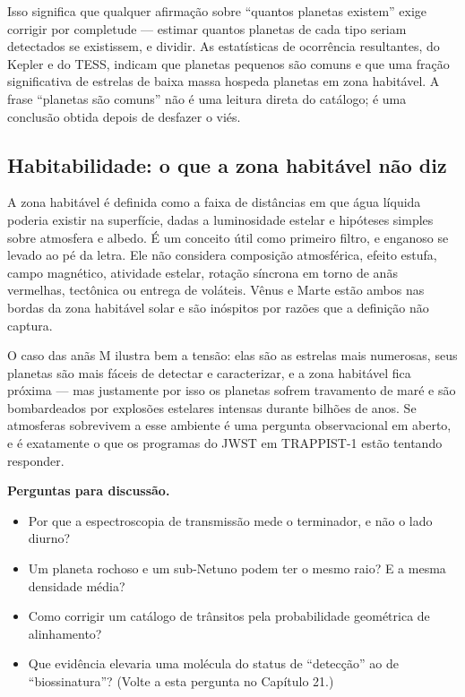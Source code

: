 \documentclass[11pt,a4paper]{article}
\begin{document}
Isso significa que qualquer afirmação sobre ``quantos planetas existem'' exige corrigir por completude --- estimar quantos planetas de cada tipo seriam detectados se existissem, e dividir. As estatísticas de ocorrência resultantes, do Kepler e do TESS, indicam que planetas pequenos são comuns e que uma fração significativa de estrelas de baixa massa hospeda planetas em zona habitável. A frase ``planetas são comuns'' não é uma leitura direta do catálogo; é uma conclusão obtida depois de desfazer o viés.

\subsection*{Habitabilidade: o que a zona habitável não diz}

A zona habitável é definida como a faixa de distâncias em que água líquida poderia existir na superfície, dadas a luminosidade estelar e hipóteses simples sobre atmosfera e albedo. É um conceito útil como primeiro filtro, e enganoso se levado ao pé da letra. Ele não considera composição atmosférica, efeito estufa, campo magnético, atividade estelar, rotação síncrona em torno de anãs vermelhas, tectônica ou entrega de voláteis. Vênus e Marte estão ambos nas bordas da zona habitável solar e são inóspitos por razões que a definição não captura.

O caso das anãs M ilustra bem a tensão: elas são as estrelas mais numerosas, seus planetas são mais fáceis de detectar e caracterizar, e a zona habitável fica próxima --- mas justamente por isso os planetas sofrem travamento de maré e são bombardeados por explosões estelares intensas durante bilhões de anos. Se atmosferas sobrevivem a esse ambiente é uma pergunta observacional em aberto, e é exatamente o que os programas do JWST em TRAPPIST-1 estão tentando responder.

\textbf{Perguntas para discussão.}
\begin{itemize}
\item Por que a espectroscopia de transmissão mede o terminador, e não o lado diurno?
\item Um planeta rochoso e um sub-Netuno podem ter o mesmo raio? E a mesma densidade média?
\item Como corrigir um catálogo de trânsitos pela probabilidade geométrica de alinhamento?
\item Que evidência elevaria uma molécula do status de ``detecção'' ao de ``biossinatura''? (Volte a esta pergunta no Capítulo 21.)
\end{itemize}
\end{document}
